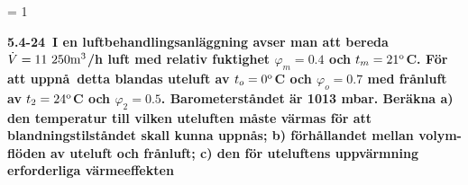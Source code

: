 


\pageno = 1

\noindent \bf 5.4-24\rm ~I en luftbehandlingsanl\"aggning avser man
att bereda $\dot{V}=11\ 250\rm{m}^3$/h luft med relativ
fuktighet $\varphi_{m}=0.4$ och $t_{m}=21^{\rm{o}}$C. F\"or
att uppn\aa\ detta blandas uteluft av $t_{o}=0^{\rm{o}}$C och
$\varphi_{o}=0.7$ med fr\aa nluft av $t_{2}=24^{\rm{o}}$C och
$\varphi_{2}=0.5$. Barometerst\aa ndet \"ar 1013 mbar.
Ber\"akna a) den temperatur till vilken
uteluften m\aa ste v\"armas f\"or att blandningstilst\aa ndet
skall kunna uppn\aa s; b) f\"orh\aa llandet
mellan volym-\hfill\break fl\"oden av uteluft och fr\aa nluft;
c) den f\"or uteluftens uppv\"armning erforderliga
v\"armeeffekten

\medskip





